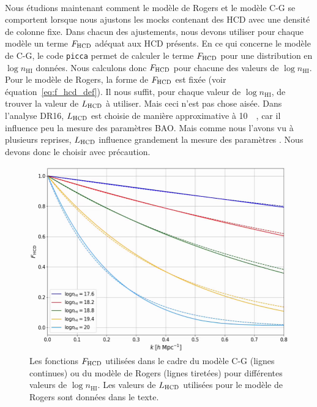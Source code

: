 \documentclass[11pt, twoside, a4paper, openright]{report}
\begin{document}
\paragraph{}
Nous étudions maintenant comment le modèle de Rogers et le modèle C-G se comportent lorsque nous ajustons les mocks contenant des HCD avec une densité de colonne fixe.
Dans chacun des ajustements, nous devons utiliser pour chaque modèle un terme $F_{\textsc{HCD}}$ adéquat aux HCD présents.
En ce qui concerne le modèle de C-G, le code \texttt{picca} permet de calculer le terme $F_{\textsc{HCD}}$ pour une distribution en $\log n_{\mathrm{HI}}$ données. Nous calculons donc $F_{\textsc{HCD}}$ pour chacune des valeurs de $\log n_{\mathrm{HI}}$.
Pour le modèle de Rogers, la forme de $F_{\textsc{HCD}}$ est fixée (voir équation~\ref{eq:f_hcd_def}). Il nous suffit, pour chaque valeur de $\log n_{\mathrm{HI}}$, de trouver la valeur de $L_{\textsc{HCD}}$ à utiliser. Mais ceci n'est pas chose aisée. Dans l'analyse DR16, $L_{\textsc{HCD}}$ est choisie de manière approximative à \SI{10}{\perh\Mpc}, car il influence peu la mesure des paramètres BAO.
Mais comme nous l'avons vu à plusieurs reprises, $L_{\textsc{HCD}}$ influence grandement la mesure des paramètres \lya{}. Nous devons donc le choisir avec précaution.

\begin{figure}
  \centering
  \includegraphics[scale=0.4]{f_hcd_fixed}
  \caption{Les fonctions $F_{\textsc{HCD}}$ utilisées dans le cadre du modèle C-G (lignes continues) ou du modèle de Rogers (lignes tiretées) pour différentes valeurs de $\log n_{\mathrm{HI}}$. Les valeurs de  $L_{\textsc{HCD}}$ utilisées pour le modèle de Rogers sont données dans le texte.
}
  \label{fig:f_hcd_fixed}
\end{figure}
\end{document}
